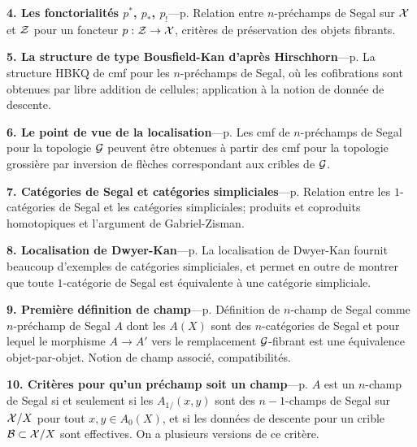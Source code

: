 \documentclass[12pt]{article}
\newcommand{\Gg}{{\cal G}}
\newcommand{\Bb}{{\cal B}}
\newcommand{\Xx}{{\cal X}}
\newcommand{\Zz}{{\cal Z}}
\begin{document}
\noindent
{\bf 4. Les fonctorialit\'es $p^{\ast}$, $p_{\ast}$, $p_!$}---p.
\pageref{fonctorialitepage}
\newline
{\small
Relation entre $n$-pr\'echamps de Segal sur $\Xx$ et $\Zz$ pour un foncteur
$p:\Zz
\rightarrow \Xx$, crit\`eres de pr\'eservation des objets fibrants.
}

\noindent
{\bf 5. La structure de type Bousfield-Kan d'apr\`es Hirschhorn}---p.
\pageref{bousfieldkanpage}
\newline
{\small
La structure HBKQ de cmf pour les $n$-pr\'echamps de Segal, o\`u les
cofibrations
sont obtenues par libre addition de cellules; application \`a la
notion de donn\'ee de descente. }

\noindent
{\bf 6. Le point de vue de la localisation}---p.
\pageref{localisationpage}
\newline
{\small
Les cmf de $n$-pr\'echamps de Segal pour la topologie $\Gg$ peuvent \^etre
obtenues
\`a partir des cmf pour la topologie grossi\`ere par inversion de fl\`eches
correspondant aux cribles de $\Gg$.
}

\noindent
{\bf 7. Cat\'egories de Segal et cat\'egories simpliciales}---p.
\pageref{segsimplpage}
\newline
{\small
Relation entre les $1$-cat\'egories de Segal et les cat\'egories simpliciales;
produits et coproduits homotopiques et l'argument de Gabriel-Zisman.
}

\noindent
{\bf 8. Localisation de Dwyer-Kan}---p.
\pageref{dwyerkanpage}
\newline
{\small
La localisation de Dwyer-Kan fournit beaucoup d'exemples de cat\'egories
simpliciales, et permet en outre de montrer que toute $1$-cat\'egorie de Segal
est \'equivalente \`a une cat\'egorie simpliciale.
}

\noindent
{\bf 9. Premi\`ere d\'efinition de champ}---p.
\pageref{notionchamppage}
\newline
{\small
D\'efinition de $n$-champ de Segal comme $n$-pr\'echamp de Segal $A$ dont les
$A(X)$ sont des $n$-cat\'egories de Segal et pour lequel le morphisme
$A\rightarrow A'$ vers le remplacement $\Gg$-fibrant est une \'equivalence
objet-par-objet. Notion de champ associ\'e, compatibilit\'es.
}

\noindent
{\bf 10. Crit\`eres pour qu'un pr\'echamp soit un champ}---p.
\pageref{caracterisationpage}
\newline
{\small
$A$ est un $n$-champ de Segal si et seulement si les $A_{1/}(x,y)$ sont des
$n-1$-champs de Segal sur $\Xx /X$ pour tout $x,y\in A_0(X)$, et si les
donn\'ees de descente pour un crible $\Bb \subset \Xx /X$ sont effectives.
On a plusieurs versions de ce crit\`ere.
}
\end{document}
